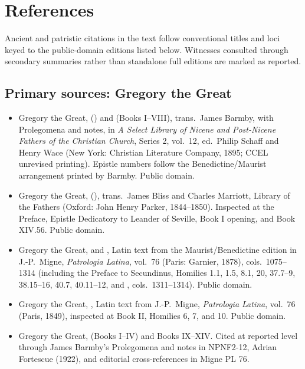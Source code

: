 \section{References}

\begingroup
\raggedright

Ancient and patristic citations in the text follow conventional titles and loci
keyed to the public-domain editions listed below. Witnesses consulted through
secondary summaries rather than standalone full editions are marked as reported.

\subsection*{Primary sources: Gregory the Great}

\begin{itemize}
\item Gregory the Great,  () and  (Books I--VIII), trans.\ James
Barmby, with Prolegomena and notes, in \textit{A Select Library of Nicene and
Post-Nicene Fathers of the Christian Church}, Series 2, vol.~12, ed.\ Philip
Schaff and Henry Wace (New York: Christian Literature Company, 1895; CCEL
unrevised printing). Epistle numbers follow the Benedictine/Maurist
arrangement printed by Barmby. Public domain.
\item Gregory the Great,  (), trans.\ James Bliss and Charles Marriott, Library of the Fathers
(Oxford: John Henry Parker, 1844--1850). Inspected at the Preface, Epistle
Dedicatory to Leander of Seville, Book I opening, and Book XIV.56. Public
domain.
\item Gregory the Great,  and , Latin text from the Maurist/Benedictine edition in
J.-P.\ Migne, \textit{Patrologia Latina}, vol.~76 (Paris: Garnier, 1878),
cols.\ 1075--1314 (including the Preface to Secundinus, Homilies 1.1, 1.5, 8.1,
20, 37.7--9, 38.15--16, 40.7, 40.11--12, and , cols.\ 1311--1314). Public domain.
\item Gregory the Great, , Latin text
from J.-P.\ Migne, \textit{Patrologia Latina}, vol.~76 (Paris, 1849), inspected
at Book II, Homilies 6, 7, and 10. Public domain.
\item Gregory the Great,  (Books I--IV) and  Books IX--XIV. Cited at reported level through James Barmby's
Prolegomena and notes in NPNF2-12, Adrian Fortescue (1922), and editorial
cross-references in Migne PL 76.
\end{itemize}

